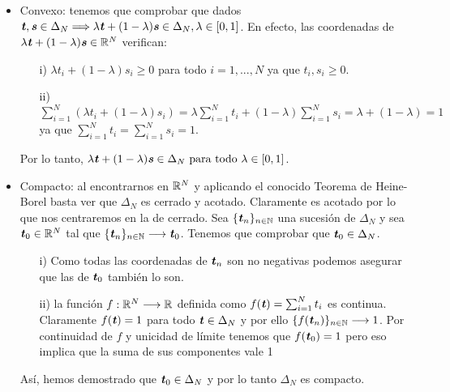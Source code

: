 	\begin{itemize}
		\item  Convexo: tenemos que comprobar que dados $ \textbf{\emph{t}}, \textbf{\emph{s}} \in \Delta_N  \Longrightarrow \lambda\textbf{\emph{t}} + (1-\lambda)\textbf{\emph{s}} \in \Delta_N, \lambda \in \lbrack 0,1 \rbrack$. En efecto, las coordenadas de $ \lambda\textbf{\emph{t}} + (1-\lambda)\textbf{\emph{s}} \in \mathbb{R}^N $ verifican:
		\begin{itemize}
			\item [i) ] $ \lambda t_i + (1-\lambda)s_i \geq 0 $ para todo $ i = 1,..., N $ ya que $ t_i, s_i \geq 0 $.
			\item [ii) ] $ \sum_{i=1}^{N} (\lambda t_i + (1-\lambda)s_i) =   \lambda \sum_{i=1}^{N} t_i + (1-\lambda)\sum_{i=1}^{N} s_i = \lambda + (1 - \lambda) = 1$ ya que $ \sum_{i=1}^{N} t_i = \sum_{i=1}^{N} s_i = 1  $.
		\end{itemize}
	
		Por lo tanto, $ \lambda\textbf{\emph{t}} + (1-\lambda)\textbf{\emph{s}} \in \Delta_N \text{ para todo }\lambda \in \lbrack 0,1 \rbrack $.
		
		\item Compacto: al encontrarnos en $ \mathbb{R}^N $ y aplicando el conocido Teorema de Heine-Borel basta ver que $ \Delta_N $ es cerrado y acotado. Claramente es acotado por lo que nos centraremos en la de cerrado. Sea $ \lbrace \textbf{\emph{t}}_n \rbrace_{ n \in \mathbb{N}} $ una sucesión de $ \Delta_N $ y sea $ \textbf{\emph{t}}_0 \in \mathbb{R}^N $ tal que $ \lbrace \textbf{\emph{t}}_n \rbrace_{ n \in \mathbb{N}} \longrightarrow \textbf{\emph{t}}_0 $. Tenemos que comprobar que $ \textbf{\emph{t}}_0 \in \Delta_N $. 
		\begin{itemize}
		\item[i) ] Como todas las coordenadas de $ \textbf{\emph{t}}_n $ son no negativas podemos asegurar que las de $ \textbf{\emph{t}}_0 $ también lo son.
		\item[ii) ] la función $ f: \mathbb{R}^N \longrightarrow \mathbb{R} $ definida como $ f(\textbf{\emph{t}}) =  \sum_{i=1}^{N} t_i $ es continua. Claramente $ f(\textbf{\emph{t}}) = 1 $ para todo $ \textbf{\emph{t}} \in \Delta_N $ y por ello $ \lbrace f(\textbf{\emph{t}}_n) \rbrace_{ n \in \mathbb{N}} \longrightarrow 1$. Por continuidad de $ f $ y unicidad de límite tenemos que $ f(\textbf{\emph{t}}_0) = 1 $ pero eso implica que la suma de sus componentes vale 1
		\end{itemize} 
	
		Así, hemos demostrado que $ \textbf{\emph{t}}_0 \in \Delta_N $ y por lo tanto $ \Delta_N $ es compacto. 
	\end{itemize}


